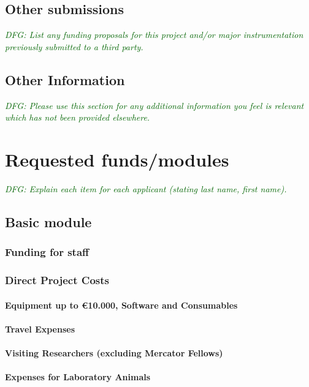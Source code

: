 \documentclass[a4paper,11pt]{amsart}
\theoremstyle{definition}
\newcommand{\<}{\langle}
\renewcommand{\>}{\rangle}
\newcommand{\dfg}[1]{\emph{\textcolor{darkgreen}{DFG: #1}}}
\begin{document}
\subsection{Other submissions}
\dfg{List any funding proposals for this project and/or major
  instrumentation previously submitted to a third party.}

\subsection{Other Information}
\dfg{Please use this section for any additional information you feel
  is relevant which has not been provided elsewhere.}

\section{Requested funds/modules}
\dfg{Explain each item for each applicant (stating last name, first
  name).}

\subsection{Basic module}

\subsubsection{Funding for staff}

\lipsum[9]

\subsubsection{Direct Project Costs}

\paragraph{Equipment up to \euro 10.000, Software and Consumables}

\paragraph{Travel Expenses}

\paragraph{Visiting Researchers (excluding Mercator Fellows)}

\paragraph{Expenses for Laboratory Animals}
\end{document}
